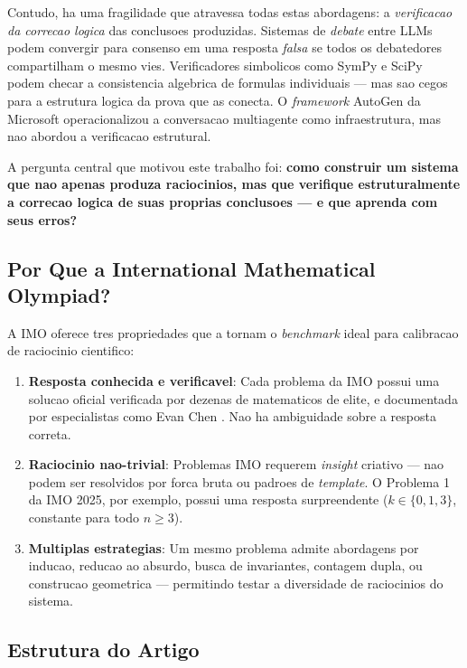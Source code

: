 \documentclass[5p]{elsarticle}
\begin{document}
Contudo, ha uma fragilidade que atravessa todas estas abordagens: a
\textit{verificacao da correcao logica} das conclusoes produzidas. Sistemas de
\textit{debate} entre LLMs podem convergir para consenso em uma resposta
\textit{falsa} se todos os debatedores compartilham o mesmo vies. Verificadores
simbolicos como SymPy e SciPy \cite{meurer2017sympy, virtanen2020scipy} podem
checar a consistencia algebrica de formulas individuais --- mas sao cegos para
a estrutura logica da prova que as conecta. O \textit{framework} AutoGen da
Microsoft \cite{wu2023autogen} operacionalizou a conversacao multiagente como
infraestrutura, mas nao abordou a verificacao estrutural.

A pergunta central que motivou este trabalho foi: \textbf{como construir um sistema
que nao apenas produza raciocinios, mas que verifique estruturalmente a correcao
logica de suas proprias conclusoes --- e que aprenda com seus erros?}

\subsection{Por Que a International Mathematical Olympiad?}

A IMO oferece tres propriedades que a tornam o \textit{benchmark} ideal para
calibracao de raciocinio cientifico:

\begin{enumerate}[label=\textbf{(\roman*)}]
  \item \textbf{Resposta conhecida e verificavel}: Cada problema da IMO possui uma
        solucao oficial verificada por dezenas de matematicos de elite, e documentada
        por especialistas como Evan Chen \cite{chen2020imo}. Nao ha ambiguidade sobre
        a resposta correta.
  \item \textbf{Raciocinio nao-trivial}: Problemas IMO requerem \textit{insight}
        criativo --- nao podem ser resolvidos por forca bruta ou padroes de
        \textit{template}. O Problema 1 da IMO 2025, por exemplo, possui uma resposta
        surpreendente ($k \in \{0,1,3\}$, constante para todo $n \geq 3$).
  \item \textbf{Multiplas estrategias}: Um mesmo problema admite abordagens por
        inducao, reducao ao absurdo, busca de invariantes, contagem dupla, ou
        construcao geometrica --- permitindo testar a diversidade de raciocinios
        do sistema.
\end{enumerate}

\subsection{Estrutura do Artigo}
\end{document}
